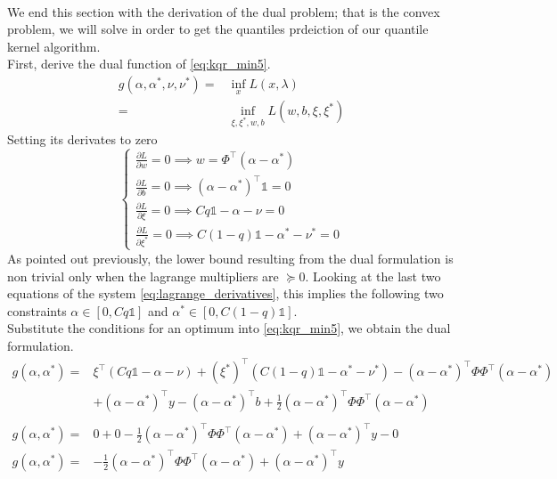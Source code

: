 \\
We end this section with the derivation of the dual problem; that is the convex problem, we will solve in order to get the quantiles prdeiction of our quantile kernel algorithm.
\\
First, derive the dual function of \ref{eq:kqr_min5}.
\begin{equation}
    \begin{aligned}
        g(\alpha, \alpha^*, \nu, \nu^*)=& \inf_x L(x,\lambda)\\
    = & \inf_{\xi, \xi^*, w, b} L(w,b,\xi,\xi^*)
\end{aligned}
\end{equation}
Setting its derivates to zero
\begin{equation}\label{eq:lagrange_derivatives}
    \begin{cases}
        \frac{\partial L}{\partial w}=0 \implies w=\Phi^\intercal(\alpha-\alpha^*)
        \\
        \frac{\partial L}{\partial b}=0 \implies (\alpha-\alpha^*)^\intercal\mathbb{1}=0
        \\
        \frac{\partial L}{\partial \xi}=0 \implies Cq \mathbb{1}-\alpha- \nu=0
        \\
        \frac{\partial L}{\partial \xi^*}=0 \implies C(1-q)\mathbb{1} -\alpha^* -\nu^*=0
    \end{cases}
\end{equation}
As pointed out previously, the lower bound resulting from the dual formulation is non trivial only when the lagrange multipliers are $\succeq 0$. Looking at the last two equations of the system \ref{eq:lagrange_derivatives}, this implies the following two constraints $\alpha \in [0, Cq\mathbb{1}]$ and $\alpha^*\in [0, C(1-q)\mathbb{1}]$.
\\
Substitute the conditions for an optimum into \ref{eq:kqr_min5}, we obtain the dual formulation.
\begin{equation}
    \begin{aligned}
        g(\alpha, \alpha^*)=& \xi^\intercal(Cq\mathbb{1}-\alpha -\nu)+(\xi^*)^\intercal(C(1-q)\mathbb{1}-\alpha^*-\nu^*)-(\alpha-\alpha^*)^\intercal \Phi\Phi^\intercal(\alpha-\alpha^*)
        \\
        & +(\alpha-\alpha^*)^\intercal y-(\alpha-\alpha^*)^\intercal b+\frac{1}{2}(\alpha-\alpha^*)^\intercal \Phi\Phi^\intercal(\alpha-\alpha^*)
        \\
        \\
        g(\alpha, \alpha^*)=& 0+0-\frac{1}{2}(\alpha-\alpha^*)^\intercal \Phi\Phi^\intercal(\alpha-\alpha^*)+(\alpha-\alpha^*)^\intercal y-0
        \\
        g(\alpha, \alpha^*)=& -\frac{1}{2}(\alpha-\alpha^*)^\intercal \Phi\Phi^\intercal(\alpha-\alpha^*)+(\alpha-\alpha^*)^\intercal y
    \end{aligned}
\end{equation}
